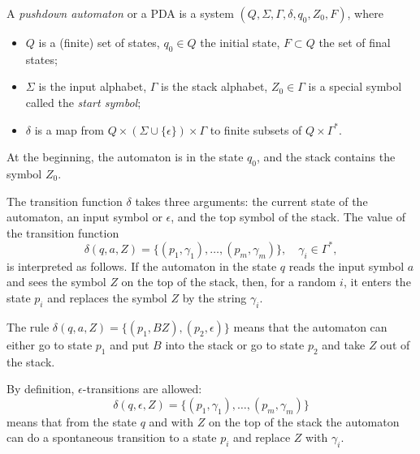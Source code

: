 \begin{page}

\begin{dfn}
A \emph{pushdown automaton} or a PDA is a system $(Q, \Sigma, \Gamma, \delta, q_0, Z_0, F)$, where
\begin{itemize}
\item
$Q$ is a (finite) set of states, $q_0 \in Q$ the initial state, $F \subset Q$ the set of final states;
\item
$\Sigma$ is the input alphabet, $\Gamma$ is the stack alphabet, $Z_0 \in \Gamma$ is a special symbol called the \emph{start symbol};
\item
$\delta$ is a map from $Q \times (\Sigma \cup \{\epsilon\}) \times \Gamma$ to finite subsets of $Q \times \Gamma^*$.
\end{itemize}
\end{dfn}

\end{page}

\begin{page}

At the beginning, the automaton is in the state $q_0$, and the stack contains the symbol $Z_0$.

The transition function $\delta$ takes three arguments:
the current state of the automaton, an input symbol or $\epsilon$, and the top symbol of the stack.
The value of the transition function
\[
\delta(q, a, Z) = \{(p_1, \gamma_1), \ldots, (p_m, \gamma_m)\}, \quad \gamma_i \in \Gamma^*,
\]
is interpreted as follows.
If the automaton in the state $q$ reads the input symbol $a$ and sees the symbol $Z$ on the top of the stack,
then, for a random $i$, it enters the state $p_i$ and replaces the symbol $Z$ by the string $\gamma_i$.


\end{page}

\begin{page}

\begin{exl}
The rule $\delta(q, a, Z) = \{(p_1, BZ), (p_2, \epsilon)\}$ means that the automaton can either go to state $p_1$ and put $B$ into the stack
or go to state $p_2$ and take $Z$ out of the stack.
\end{exl}

\end{page}

\begin{page}


By definition, $\epsilon$-transitions are allowed:
\[
\delta(q, \epsilon, Z) = \{(p_1, \gamma_1), \ldots, (p_m, \gamma_m)\}
\]
means that from the state $q$ and with $Z$ on the top of the stack the automaton can do a spontaneous transition
to a state $p_i$ and replace $Z$ with $\gamma_i$.


\end{page}

